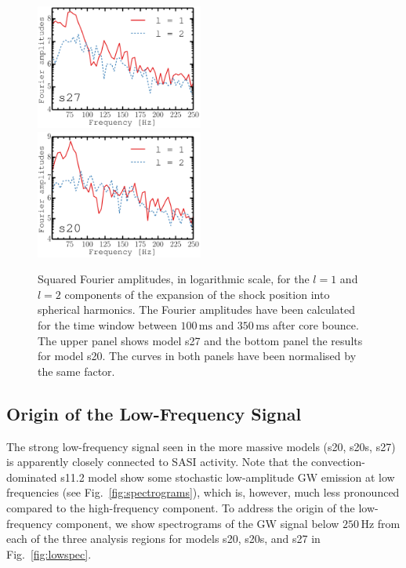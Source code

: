 \begin{figure}
\includegraphics[width=0.49\textwidth]{./images/chp1/fig13a.pdf}
\\
\includegraphics[width=0.49\textwidth]{./images/chp1/fig13b.pdf}
\caption{Squared Fourier amplitudes, in logarithmic scale, for the $l=1$ and $l=2$ components of the
  expansion of the shock position into spherical harmonics.  The
  Fourier amplitudes have been calculated for the time window between
  $100 \, \mathrm{ms}$ and $350 \, \mathrm{ms}$ after core bounce. 
  The upper panel shows model s27 and the bottom panel the results for model s20.
  The curves in both panels have been normalised by the same factor.
\label{fig:sfreq}}
\end{figure}
  
\subsection{Origin of the Low-Frequency Signal}
\label{sec:lowfreq}
The strong low-frequency signal seen in the more massive models (s20, s20s, s27)
is apparently closely connected to SASI activity.
Note that the convection-dominated s11.2 model show
some stochastic low-amplitude GW emission at low frequencies (see
Fig.~\ref{fig:spectrograms}), which is, however, much less pronounced
compared to the high-frequency component.
To address the origin of
the low-frequency component, we show spectrograms of the GW signal below
$250 \, \mathrm{Hz}$ from each of the three analysis regions for models
s20, s20s, and s27 in Fig.~\ref{fig:lowspec}.

